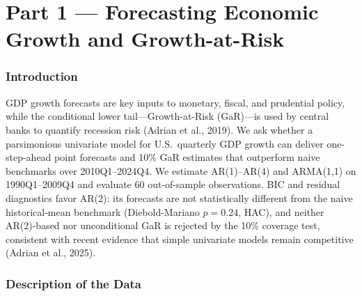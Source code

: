 \documentclass[12pt]{article}
\begin{document}
\part{Part 1 --- Forecasting Economic Growth and Growth-at-Risk}
\setcounter{section}{0}
\setcounter{figure}{0}
\setcounter{table}{0}
\setcounter{equation}{0}
\renewcommand{\thefigure}{1.\arabic{figure}}
\renewcommand{\thetable}{1.\arabic{table}}
\renewcommand{\theequation}{1.\arabic{equation}}

\section{Introduction}\label{sec:p1-intro}

GDP growth forecasts are key inputs to monetary, fiscal, and prudential policy, while the conditional lower tail---Growth-at-Risk (GaR)---is used by central banks to quantify recession risk (Adrian et al., 2019).
We ask whether a parsimonious univariate model for U.S.\ quarterly GDP growth can deliver one-step-ahead point forecasts and 10\% GaR estimates that outperform naive benchmarks over 2010Q1--2024Q4.
We estimate AR(1)--AR(4) and ARMA(1,1) on 1990Q1--2009Q4 and evaluate 60 out-of-sample observations.
\newline
\newline
BIC and residual diagnostics favor AR(2): its forecasts are not statistically different from the naive historical-mean benchmark (Diebold-Mariano $p=0.24$, HAC), and neither AR(2)-based nor unconditional GaR is rejected by the 10\% coverage test, consistent with recent evidence that simple univariate models remain competitive (Adrian et al., 2025).




\section{Description of the Data}\label{sec:p1-data}
\end{document}
